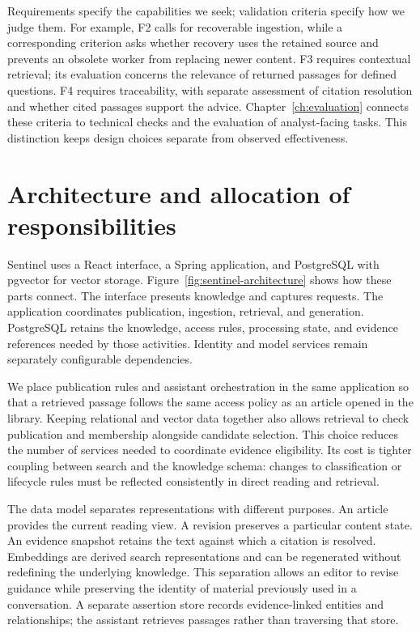Requirements specify the capabilities we seek; validation criteria specify how we judge them. For example, F2 calls for recoverable ingestion, while a corresponding criterion asks whether recovery uses the retained source and prevents an obsolete worker from replacing newer content. F3 requires contextual retrieval; its evaluation concerns the relevance of returned passages for defined questions. F4 requires traceability, with separate assessment of citation resolution and whether cited passages support the advice. Chapter~\ref{ch:evaluation} connects these criteria to technical checks and the evaluation of analyst-facing tasks. This distinction keeps design choices separate from observed effectiveness.

\section{Architecture and allocation of responsibilities}

Sentinel uses a React interface, a Spring application, and PostgreSQL with pgvector for vector storage. Figure~\ref{fig:sentinel-architecture} shows how these parts connect. The interface presents knowledge and captures requests. The application coordinates publication, ingestion, retrieval, and generation. PostgreSQL retains the knowledge, access rules, processing state, and evidence references needed by those activities. Identity and model services remain separately configurable dependencies.

We place publication rules and assistant orchestration in the same application so that a retrieved passage follows the same access policy as an article opened in the library. Keeping relational and vector data together also allows retrieval to check publication and membership alongside candidate selection. This choice reduces the number of services needed to coordinate evidence eligibility. Its cost is tighter coupling between search and the knowledge schema: changes to classification or lifecycle rules must be reflected consistently in direct reading and retrieval.

The data model separates representations with different purposes. An article provides the current reading view. A revision preserves a particular content state. An evidence snapshot retains the text against which a citation is resolved. Embeddings are derived search representations and can be regenerated without redefining the underlying knowledge. This separation allows an editor to revise guidance while preserving the identity of material previously used in a conversation. A separate assertion store records evidence-linked entities and relationships; the assistant retrieves passages rather than traversing that store.

